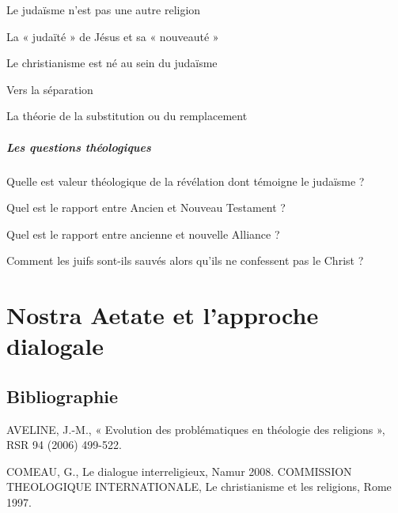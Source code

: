     
    \def\labelenumiii{\alph{enumiii}.}
    
      
      Le judaïsme n'est pas une autre religion
      
    
      
      La « judaïté » de Jésus et sa « nouveauté »
      
    
      
      Le christianisme est né au sein du judaïsme
      
    
      
      Vers la séparation
      
    
      
      La théorie de la substitution ou du remplacement
      
    
  
    
    \paragraph{Les questions théologiques}
    

    
    \def\labelenumiii{\alph{enumiii}.}
    
      
      Quelle est valeur théologique de la révélation dont témoigne le
      judaïsme ?
      
    
      
      Quel est le rapport entre Ancien et Nouveau Testament ?
      
    
      
      Quel est le rapport entre ancienne et nouvelle Alliance ?
      
    
      
      Comment les juifs sont-ils sauvés alors qu'ils ne confessent pas
      le Christ ?
 
 
 \chapter{Nostra Aetate  et  l’approche  dialogale} 
\section{Bibliographie}

AVELINE,  J.-M.,  «  Evolution  des  problématiques  en  théologie  des  religions  »,  RSR  94  (2006) 499-522. 

COMEAU, G.,  Le  dialogue  interreligieux, Namur 2008. COMMISSION  THEOLOGIQUE  INTERNATIONALE,  Le  christianisme  et  les  religions,  Rome 1997. 

